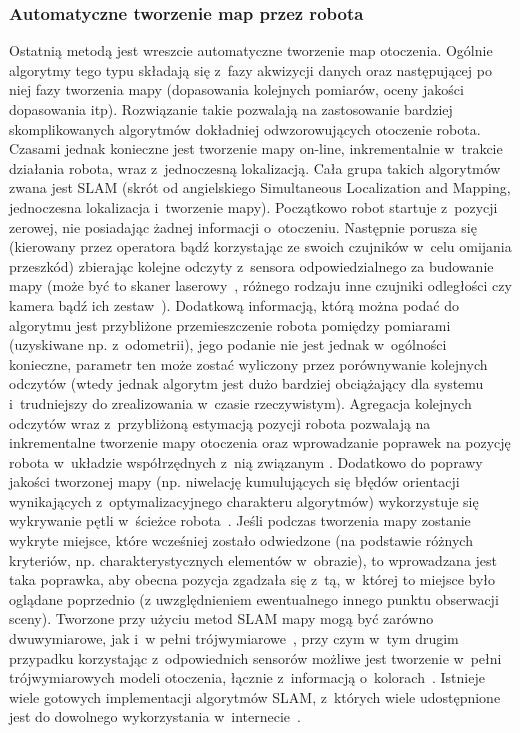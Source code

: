 \subsubsection{Automatyczne tworzenie map przez robota}

Ostatnią metodą jest wreszcie automatyczne tworzenie map otoczenia. Ogólnie
algorytmy tego typu składają się z~fazy akwizycji danych oraz następującej
po niej fazy tworzenia mapy (dopasowania kolejnych pomiarów, oceny jakości
dopasowania itp). Rozwiązanie takie pozwalają na zastosowanie bardziej skomplikowanych
algorytmów dokładniej odwzorowujących otoczenie robota. Czasami jednak konieczne
jest tworzenie mapy on-line, inkrementalnie w~trakcie działania robota,
wraz z~jednoczesną lokalizacją. Cała grupa takich algorytmów zwana jest SLAM
(skrót od angielskiego Simultaneous Localization and Mapping, jednoczesna
lokalizacja i~tworzenie mapy). Początkowo robot startuje z~pozycji zerowej,
nie posiadając żadnej informacji o~otoczeniu. Następnie porusza się (kierowany przez
operatora bądź korzystając ze swoich czujników w~celu omijania przeszkód) zbierając
kolejne odczyty z~sensora odpowiedzialnego za budowanie mapy (może być to skaner laserowy~\cite{laser_slam},
różnego rodzaju inne czujniki odległości czy kamera bądź ich zestaw~\cite{vslam}). Dodatkową
informacją, którą można podać do algorytmu jest przybliżone przemieszczenie robota
pomiędzy pomiarami (uzyskiwane np. z~odometrii), jego podanie nie jest jednak w~ogólności
konieczne, parametr ten może zostać wyliczony przez porównywanie kolejnych odczytów
(wtedy jednak algorytm jest dużo bardziej obciążający dla systemu i~trudniejszy do zrealizowania
w~czasie rzeczywistym). Agregacja kolejnych odczytów wraz z~przybliżoną estymacją
pozycji robota pozwalają na inkrementalne tworzenie mapy otoczenia oraz wprowadzanie
poprawek na pozycję robota w~układzie współrzędnych z~nią związanym \cite{Dissanayake01asolution}.
Dodatkowo do poprawy jakości tworzonej mapy (np. niwelację kumulujących się błędów orientacji
wynikających z~optymalizacyjnego charakteru algorytmów) wykorzystuje się wykrywanie pętli
w~ścieżce robota~\cite{slam-loop}. Jeśli podczas tworzenia mapy zostanie wykryte
miejsce, które wcześniej zostało odwiedzone (na podstawie różnych kryteriów, np. charakterystycznych
elementów w~obrazie), to wprowadzana jest taka poprawka, aby obecna pozycja zgadzała się
z~tą, w~której to miejsce było oglądane poprzednio (z uwzględnieniem ewentualnego
innego punktu obserwacji sceny). Tworzone przy użyciu metod SLAM mapy mogą być zarówno
dwuwymiarowe, jak i~w pełni trójwymiarowe~\cite{6dslam}, przy czym w~tym drugim przypadku
korzystając z~odpowiednich sensorów możliwe jest tworzenie w~pełni trójwymiarowych
modeli otoczenia, łącznie z~informacją o~kolorach~\cite{kinect_slam}.
Istnieje wiele gotowych implementacji algorytmów SLAM, z~których wiele udostępnione
jest do dowolnego wykorzystania w~internecie~\cite{openslam}.


